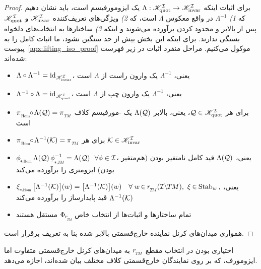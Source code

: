 \begin{proof}
    برای اثبات اینکه $\Lambda: \mathscr{K}_\textup{quot}^{\mathcal{I}} \to \mathscr{K}_\textup{invar}^{\mathcal{I}}$ یک ایزومورفیسم است، باید نشان دهیم که
    \textit{1)} $\Lambda^{-1}$ در واقع معکوس $\Lambda$ است، که
    \textit{2)} ویژگی‌های تعریف‌کننده $\mathscr{K}_\textup{invar}^{\mathcal{I}}$ و $\mathscr{K}_\textup{quot}^{\mathcal{I}}$ پس از بالابر و محدود کردن برآورده می‌شوند و اینکه
    \textit{3)} ساختارها به انتخاب‌های دلخواه بستگی ندارند.
    برای اینکه این بخش بیش از حد سنگین نشود، ما اثبات کامل را به پیوست~\ref{apx:lifting_iso_proof} موکول می‌کنیم.
    مراحل منفرد اثبات در زیر فهرست شده‌اند:
    \begin{itemize}[leftmargin=1.25cm]
        \item[\it 1\hspace{1pt}a)] $\Lambda \circ \Lambda^{-1} = \mathrm{id}_{\mathscr{K}_\textup{invar}^{\mathcal{I}}}$،
            یعنی، $\Lambda^{-1}$ یک وارون راست از $\Lambda$ است
        \item[\it 1\hspace{1pt}b)] $\Lambda^{-1} \circ \Lambda = \mathrm{id}_{\mathscr{K}_\textup{quot}^{\mathcal{I}}}$،
            یعنی، $\Lambda^{-1}$ یک وارون چپ از $\Lambda$ است
        \item[\it 2\hspace{1pt}a)] $\piHom \mkern-5mu\circ\mkern-2mu \Lambda(\Q) = \piTM$ برای هر $\mathcal{Q} \in \mathscr{K}_\textup{quot}^{\mathcal{I}}$،
            یعنی، بالابر $\Lambda(\mathcal{Q})$ یک -مورفیسم کلاف است
        \item[\it 2\hspace{1pt}b)] ${\piHom \mkern-5mu\circ\mkern-2mu \Lambda^{-1}(\K) = \piTM}$ برای هر $\mathcal{K} \in \mathscr{K}_\textup{invar}^{\mathcal{I}}$
        \item[\it 2\hspace{1pt}c)] $\dphiHom \Lambda(\Q)\, \dphiTMinv = \Lambda(\Q)\ \ \forall \phi \in \I$،
            یعنی، $\Lambda(\mathcal{Q})$ قید کامل نامتغیر بودن (هم‌متغیر بودن) ایزومتری را برآورده می‌کند
        \item[\it 2\hspace{1pt}d)] $\dxiHom \big[\Lambda^{-1}(\K)\big](w) = \big[\Lambda^{-1}(\K)\big](w) \ \ \
            \forall\; w \mkern-2mu\in\mkern-1mu \rTM(\ITM),\ \xi \mkern-1mu\in\mkern-1mu \Stab{w}$، 
            یعنی، $\Lambda^{-1}(\mathcal{K})$ قید پایدارساز را برآورده می‌کند
        \item[\it 3)] تمام ساختارها و اثبات‌ها از انتخاب خاص $\PhirNoArg$ مستقل هستند
    \end{itemize}
    همواری میدان‌های کرنل نماینده خارج‌قسمتی بالابر شده بنا به تعریف برقرار است.
\end{proof}
اختیاری بودن در انتخاب مقطع $\rTM$ به میدان‌های کرنل خارج‌قسمتی متفاوت اما ایزومورف، که بر روی نمایندگان خارج‌قسمتی کلاف مختلف بیان شده‌اند، اجازه می‌دهد.


